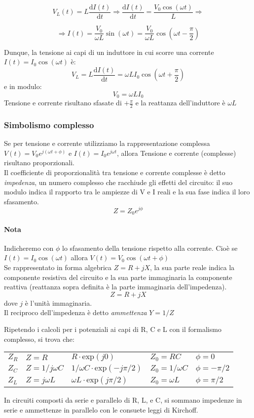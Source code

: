     $$ V_L(t) = L \frac{\mathrm{d}I(t)}{\mathrm{d}t} \Rightarrow \frac{\mathrm{d}I(t)}{\mathrm{d}t} = \frac{V_0 \cos(\omega t)}{L} \Rightarrow$$
    
    $$\Rightarrow I(t) = \frac{V_0}{\omega L}\sin(\omega t) = \frac{V_0}{\omega L}\cos\left(\omega t - \frac{\pi}{2}\right) $$

Dunque, la tensione ai capi di un induttore in cui scorre una corrente $I(t)= I_0\cos(\omega t)$ è:
    $$V_L =L\frac{\mathrm{d}I(t)}{\mathrm{d}t} =\omega L I_0 \cos\left(\omega t + \frac{\pi}{2}\right) $$
e in modulo:
$$V_0=\omega L I_0$$    
Tensione e corrente risultano sfasate di $+\frac{\pi}{2}$ e la reattanza dell'induttore è $\omega L$\\
%
\subsubsection{Simbolismo complesso}
Se per tensione e corrente utilizziamo la rappresentazione complessa $V(t)=V_0 e^{j(\omega t + \phi)}$ e $I(t)=I_0 e^{j\omega t}$, allora Tensione e corrente (complesse) risultano proporzionali.\\
%
Il coefficiente di proporzionalità tra tensione e corrente complesse è detto \textit{impedenza}, un numero complesso che racchiude gli effetti del circuito: il suo modulo indica il rapporto tra le ampiezze di V e I reali e la sua fase indica il loro sfasamento. 
    $$ Z = Z_0 e^{j\phi} $$  
\paragraph{Nota}{
        Indicheremo con $\phi$ lo sfasamento della tensione rispetto alla corrente. Cioè se $I(t)=I_0 \cos(\omega t)$ allora $V(t)=V_0\cos(\omega t + \phi)$}
    \\
Se rappresentato in forma algebrica $Z = R + jX$, la sua parte reale indica la componente resistiva del circuito e la sua parte immaginaria la componente reattiva (reattanza sopra definita è la parte immaginaria dell'impedenza).
    $$Z=R+jX$$
dove $j$ è l'unità immaginaria.\\
%
Il reciproco dell'impedenza è detto \textit{ammettenza}  $Y=1/Z$

Ripetendo i calcoli per i potenziali ai capi di R, C e L con il formalismo complesso, si trova che:
%
\begin{center}
\begin{tabular}{ l l l l l }
 $Z_R$ & $Z = R$ & $R \cdot{} \mathrm{exp}(j0)$ & $Z_0= R C$ & $\phi= 0$\\
$Z_C$ & $Z = 1/j\omega C$ & $1/\omega C \cdot{} \mathrm{exp}(-j\pi/2)$ & $Z_0= 1/\omega C$ & $\phi= -\pi/2$\\  
 $Z_L$ & $Z = j\omega L$ &  $\omega L \cdot{} \mathrm{exp}(j \pi/2)$   & $Z_0=\omega L$ & $\phi= \pi/2$
\end{tabular}
\end{center}
%
In circuiti composti da serie e parallelo di R, L, e C, si sommano impedenze in serie e ammettenze in parallelo con le consuete leggi di Kirchoff.\\
%
